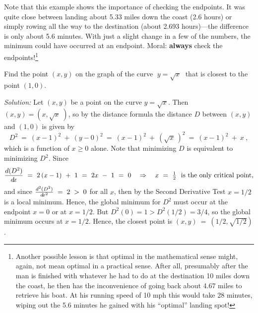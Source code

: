 \begin{exmp}
\noindent Note that this example shows the importance of checking the endpoints.
It was quite close between landing about 5.33 miles down the coast (2.6 hours)
or simply rowing all the way to the destination (about 2.693 hours)---the
difference is only about 5.6 minutes. With just a slight change in a few of the
numbers, the minimum could have occurred at an endpoint. Moral:
\textbf{always} check the endpoints!\footnote{Another possible lesson is that
optimal in the mathematical sense might, again, not mean optimal in a practical
sense. After all, presumably after the man is finished with whatever he had to
do at the destination 10 miles down the coast, he then has the inconvenience of
going back about 4.67 miles to retrieve his boat. At his running speed of 10 mph
this would take 28 minutes, wiping out the 5.6 minutes he gained with his
``optimal'' landing spot!}
\end{exmp}
\begin{exmp}\label{exmp:minmax6}
\noindent Find the point $(x,y)$ on the graph of the curve $\;y=\sqrt{x}\;$ that
is closest to the point $(1,0)$.
 \par\noindent\emph{Solution:} Let $(x,y)$ be a point on the curve $y=\sqrt{x}$.
 Then $(x,y) = (x,\sqrt{x}\;)$, so by the distance formula the distance $D$
 between $(x,y)$ and $(1,0)$ is given by
 \begin{displaymath}
  D^2 ~=~ (x-1)^2 ~+~ (y - 0)^2 ~=~ (x-1)^2 ~+~ (\sqrt{x}\,)^2 ~=~ (x-1)^2 ~+~ x~,
 \end{displaymath}
 which is a function of $x \ge 0$ alone. Note that minimizing $D$ is equivalent to
 minimizing $D^2$. Since
 \begin{displaymath}
  \dfrac{d(D^2)}{d\!x} ~=~ 2\,(x-1) ~+~ 1 ~=~ 2x ~-~ 1
   ~=~ 0 \quad\Rightarrow\quad x ~=~ \tfrac{1}{2} ~~\text{is the only critical point,}
 \end{displaymath}
 and since $\frac{d^2(D^2)}{d\!x^2} \;=\; 2 \;>\; 0$ for all $x$, then by the
 Second Derivative Test $x=1/2$ is a local minimum. Hence, the global minimum
 for $D^2$ must occur at the endpoint $x=0$ or at $x=1/2$. But $D^2(0)=1 >
 D^2(1/2)=3/4$, so the global minimum occurs at $x=1/2$. Hence, the closest
 point is $(x,y) ~=~ (1/2,\sqrt{1/2})$.
\end{exmp}
